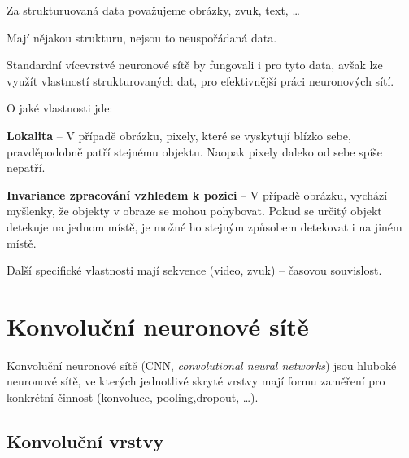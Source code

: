\begin{compactitem}
    \item Za strukturuovaná data považujeme obrázky, zvuk, text, \dots \begin{compactitem}
        \item Mají nějakou strukturu, nejsou to neuspořádaná data.
    \end{compactitem}

    \item Standardní vícevrstvé neuronové sítě by fungovali i pro tyto data, avšak lze využít vlastností strukturovaných dat, pro efektivnější práci neuronových sítí.

    O jaké vlastnosti jde: \begin{compactitem}
        \item \textbf{Lokalita} -- V případě obrázku, pixely, které se vyskytují blízko sebe, pravděpodobně patří stejnému objektu. Naopak pixely daleko od sebe spíše nepatří.

        \item \textbf{Invariance zpracování vzhledem k pozici} -- V případě obrázku, vychází myšlenky, že objekty v obraze se mohou pohybovat. Pokud se určitý objekt detekuje na jednom místě, je možné ho stejným způsobem detekovat i na jiném místě.
    \end{compactitem}

    \item Další specifické vlastnosti mají sekvence (video, zvuk) -- časovou souvislost.
\end{compactitem}


\section{Konvoluční neuronové sítě}

\begin{compactitem}
    \item Konvoluční neuronové sítě (CNN, \textit{convolutional neural networks}) jsou hluboké neuronové sítě, ve kterých jednotlivé skryté vrstvy mají formu zaměření pro konkrétní činnost (konvoluce, pooling,dropout, \dots).
\end{compactitem}

\subsection{Konvoluční vrstvy}

